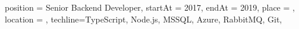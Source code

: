\begin{placex}{%
    position = {Senior Backend Developer},
    startAt = 2017,
    endAt = 2019,
    place = ,
    location = \ramatgan,
    techline={TypeScript, Node.js, MSSQL, Azure, RabbitMQ, Git},
  }%
  \RefDevFoundational
  \RefDevDevelopment
  \RefDevOptimized
\end{placex}%
